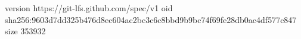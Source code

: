 version https://git-lfs.github.com/spec/v1
oid sha256:9603d7dd325b476d8ec604ac2bc3c6c8bbd9b9bc74f69fe28db0ac4df577c847
size 353932
